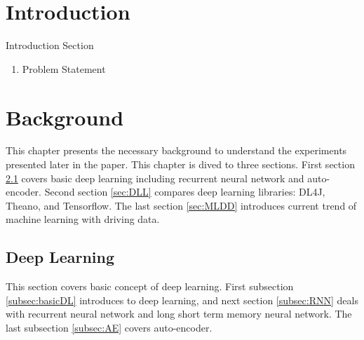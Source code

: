 \documentclass[draft,dvipsnames]{drexel-thesis}
\begin{document}
\begin{thesis}



\chapter{Introduction}\label{chap:intro}

Introduction Section
\begin{enumerate}
\item Problem Statement
\end{enumerate}



\chapter{Background}\label{sec:bg}
This chapter presents the necessary background to understand the experiments presented later in the paper. This chapter is dived to three sections. First section \ref{sec:DL} covers basic deep learning including recurrent neural network and auto-encoder. Second section \ref{sec:DLL} compares deep learning libraries: DL4J, Theano, and Tensorflow. The last section \ref{sec:MLDD} introduces current trend of machine learning with driving data.

\section{Deep Learning}\label{sec:DL}
This section covers basic concept of deep learning. First subsection \ref{subsec:basicDL} introduces to deep learning, and next section \ref{subsec:RNN} deals with recurrent neural network and long short term memory neural network. The last subsection \ref{subsec:AE} covers auto-encoder.


\end{thesis}
\end{document}
